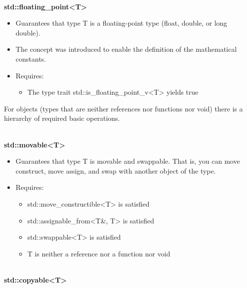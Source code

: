 \noindent
\hspace*{\fill} \\ %
\textbf{std::floating\_point<T>}

\begin{itemize}
\item
Guarantees that type T is a floating-point type (float, double, or long double).

\item
The concept was introduced to enable the definition of the mathematical constants.

\item
Requires:
\begin{itemize}
\item
The type trait std::is\_floating\_point\_v<T> yields true
\end{itemize}
\end{itemize}


For objects (types that are neither references nor functions nor void) there is a hierarchy of required basic operations.

\noindent
\hspace*{\fill} \\ %
\textbf{std::movable<T>}

\begin{itemize}
\item
Guarantees that type T is movable and swappable. That is, you can move construct, move assign, and swap with another object of the type.

\item
Requires:
\begin{itemize}
\item
std::move\_constructible<T> is satisfied

\item
std::assignable\_from<T\&, T> is satisfied

\item
std::swappable<T> is satisfied

\item
T is neither a reference nor a function nor void
\end{itemize}
\end{itemize}

\noindent
\hspace*{\fill} \\ %
\textbf{std::copyable<T>}

